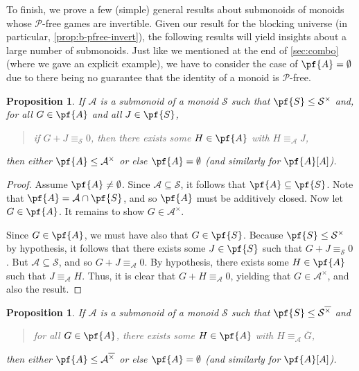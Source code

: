 \documentclass[11pt]{article}
\newtheorem{proposition}[theorem]{Proposition}
\theoremstyle{definition}
\newcommand{\set}[1]{\mathcal{#1}}
\begin{document}
To finish, we prove a few (simple) general results about submonoids of monoids
whose $\mathscr{P}$-free games are invertible. Given our result for the
blocking universe (in particular, \cref{prop:b-pfree-invert}), the following
results will yield insights about a large number of submonoids. Just like we
mentioned at the end of \cref{sec:combo} (where we gave an explicit example),
we have to consider the case of $\pf{A}=\emptyset$ due to there being no
guarantee that the identity of a monoid is $\mathscr{P}$-free.

\begin{proposition}
    If $\set{A}$ is a submonoid of a monoid $\set{S}$ such that
    $\pf{S}\leq\set{S}^\times$ and, for all $G\in\pf{A}$ and all $J\in\pf{S}$,
    \begin{quote}
        if $G+J\equiv_\set{S}0$, then there exists some $H\in\pf{A}$ with
        $H\equiv_\set{A}J$,
    \end{quote}
    then either $\pf{A}\leq\set{A}^\times$ or else $\pf{A}=\emptyset$ (and
    similarly for $\pf{A}[A]$).
\end{proposition}

\begin{proof}
    Assume $\pf{A}\neq\emptyset$. Since $\set{A}\subseteq\set{S}$, it follows
    that $\pf{A}\subseteq\pf{S}$. Note that $\pf{A}=\set{A}\cap\pf{S}$, and so
    $\pf{A}$ must be additively closed. Now let $G\in\pf{A}$. It remains to
    show $G\in\set{A}^\times$.

    Since $G\in\pf{A}$, we must have also that $G\in\pf{S}$. Because
    $\pf{S}\leq\set{S}^\times$ by hypothesis, it follows that there exists some
    $J\in\pf{S}$ such that $G+J\equiv_\set{S}0$. But $\set{A}\subseteq\set{S}$,
    and so $G+J\equiv_\set{A}0$. By hypothesis, there exists some $H\in\pf{A}$
    such that $J\equiv_\set{A}H$. Thus, it is clear that $G+H\equiv_\set{A}0$,
    yielding that $G\in\set{A}^\times$, and also the result.
\end{proof}

\begin{proposition}
    \label{prop:compat-submonoid-conj}
    If $\set{A}$ is a submonoid of a monoid $\set{S}$ such that
    $\pf{S}\leq\set{S}^{\overline{\times}}$ and
    \begin{quote}
        for all $G\in\pf{A}$, there exists some $H\in\pf{A}$ with
        $H\equiv_\set{A}\overline{G}$,
    \end{quote}
    then either $\pf{A}\leq\set{A}^{\overline{\times}}$ or else
    $\pf{A}=\emptyset$ (and similarly for $\pf{A}[A]$).
\end{proposition}
\end{document}
